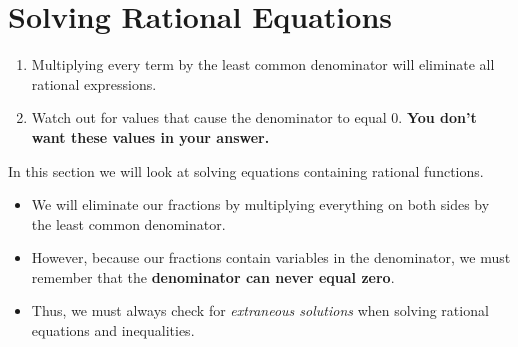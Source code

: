 \documentclass{article}
\begin{document}
\section*{Solving Rational Equations}

\begin{tcolorbox}[colframe=orange!70!white, coltitle=black, title=\textbf{Summary}]
\begin{enumerate}
    \item Multiplying every term by the least common denominator will eliminate all rational expressions.
    \item Watch out for values that cause the denominator to equal 0. \textbf{You don't want these values in your answer.}
\end{enumerate}
\end{tcolorbox}
\bigskip 

In this section we will look at solving equations containing rational functions. 
\bigskip 

\begin{itemize}
    \item We will eliminate our fractions by multiplying everything on both sides by the least common denominator.
    \item However, because our fractions contain variables in the denominator, we must remember that the {\color{blue}\textbf{denominator can never equal zero}}. 
    \item Thus, we must always check for \emph{extraneous solutions} when solving rational equations and inequalities. 
\end{itemize}
\vspace{0.25in}
\end{document}
